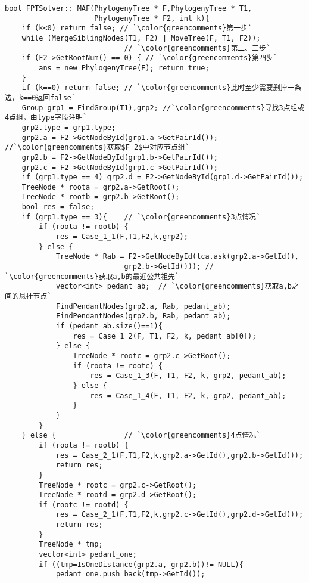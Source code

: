\begin{CJK}{UTF8}{gbsn}
\begin{lstlisting}
bool FPTSolver:: MAF(PhylogenyTree * F,PhylogenyTree * T1,
                     PhylogenyTree * F2, int k){
    if (k<0) return false; // `\color{greencomments}第一步`
    while (MergeSiblingNodes(T1, F2) | MoveTree(F, T1, F2)); 
                            // `\color{greencomments}第二、三步`
    if (F2->GetRootNum() == 0) { // `\color{greencomments}第四步`
        ans = new PhylogenyTree(F); return true;
    }
    if (k==0) return false; // `\color{greencomments}此时至少需要删掉一条边，k==0返回false`
    Group grp1 = FindGroup(T1),grp2; //`\color{greencomments}寻找3点组或4点组，由type字段注明`
    grp2.type = grp1.type;
    grp2.a = F2->GetNodeById(grp1.a->GetPairId()); //`\color{greencomments}获取$F_2$中对应节点组`
    grp2.b = F2->GetNodeById(grp1.b->GetPairId());
    grp2.c = F2->GetNodeById(grp1.c->GetPairId());
    if (grp1.type == 4) grp2.d = F2->GetNodeById(grp1.d->GetPairId());
    TreeNode * roota = grp2.a->GetRoot();
    TreeNode * rootb = grp2.b->GetRoot();
    bool res = false;
    if (grp1.type == 3){    // `\color{greencomments}3点情况`
        if (roota != rootb) {
            res = Case_1_1(F,T1,F2,k,grp2);
        } else {
            TreeNode * Rab = F2->GetNodeById(lca.ask(grp2.a->GetId(),
                            grp2.b->GetId())); // `\color{greencomments}获取a,b的最近公共祖先`
            vector<int> pedant_ab;  // `\color{greencomments}获取a,b之间的悬挂节点`
            FindPendantNodes(grp2.a, Rab, pedant_ab);
            FindPendantNodes(grp2.b, Rab, pedant_ab);
            if (pedant_ab.size()==1){
                res = Case_1_2(F, T1, F2, k, pedant_ab[0]);
            } else {
                TreeNode * rootc = grp2.c->GetRoot();
                if (roota != rootc) {
                    res = Case_1_3(F, T1, F2, k, grp2, pedant_ab);
                } else {
                    res = Case_1_4(F, T1, F2, k, grp2, pedant_ab);
                }
            }
        }
    } else {                // `\color{greencomments}4点情况`
        if (roota != rootb) {
            res = Case_2_1(F,T1,F2,k,grp2.a->GetId(),grp2.b->GetId());
            return res;
        }
        TreeNode * rootc = grp2.c->GetRoot();
        TreeNode * rootd = grp2.d->GetRoot();
        if (rootc != rootd) {
            res = Case_2_1(F,T1,F2,k,grp2.c->GetId(),grp2.d->GetId());
            return res;
        }
        TreeNode * tmp;
        vector<int> pedant_one;
        if ((tmp=IsOneDistance(grp2.a, grp2.b))!= NULL){ 
            pedant_one.push_back(tmp->GetId());

\end{lstlisting}
\end{CJK}
